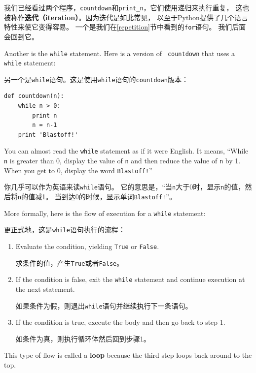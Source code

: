 \documentclass[10pt]{book}
\begin{document}
\begin{CJK}{UTF8}{gbsn}
我们已经看过两个程序，{\tt countdown}和\verb"print_n"，它们使用递归来执行重复，
这也被称作{\bf 迭代（iteration）}。因为迭代是如此常见，
以至于Python提供了几个语言特性来使它变得容易。
一个是我们在\ref{repetition}节中看到的{\tt for}语句。
我们后面会回到它。

Another is the {\tt while} statement.  Here is a version of {\tt
countdown} that uses a {\tt while} statement:

另一个是{\tt while}语句。这是使用{\tt while}语句的{\tt countdown}版本：

\begin{verbatim}
def countdown(n):
    while n > 0:
        print n
        n = n-1
    print 'Blastoff!'
\end{verbatim}
%
You can almost read the {\tt while} statement as if it were English.
It means, ``While {\tt n} is greater than 0,
display the value of {\tt n} and then reduce the value of
{\tt n} by 1.  When you get to 0, display the word {\tt Blastoff!}''

你几乎可以作为英语来读{\tt while}语句。
它的意思是，``当{\tt n}大于0时，显示{\tt n}的值，然后将{\tt n}的值减1。
当到达0的时候，显示单词{\tt Blastoff!}''。

More formally, here is the flow of execution for a {\tt while} statement:

更正式地，这是{\tt while}语句执行的流程：

\begin{enumerate}

\item Evaluate the condition, yielding {\tt True} or {\tt False}.

求条件的值，产生{\tt True}或者{\tt False}。

\item If the condition is false, exit the {\tt while} statement
and continue execution at the next statement.

如果条件为假，则退出{\tt while}语句并继续执行下一条语句。

\item If the condition is true, execute the
body and then go back to step 1.

如条件为真，则执行循环体然后回到步骤1。

\end{enumerate}

This type of flow is called a {\bf loop} because the third step
loops back around to the top.  


\end{CJK}
\end{document}
